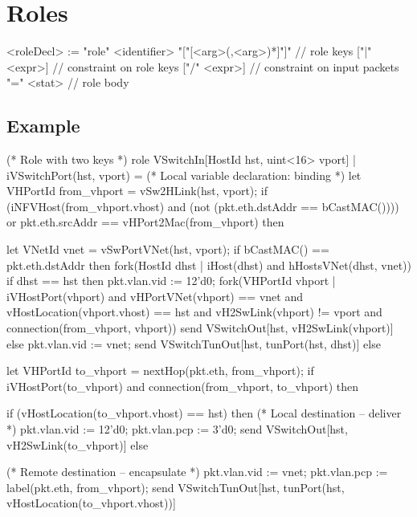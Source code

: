 \documentclass{report}
\begin{document}
\section{Roles}

\begin{bnflisting}{}
<roleDecl> := "role" <identifier> 
              "["[<arg>(,<arg>)*]"]" // role keys
              ["|" <expr>]    // constraint on role keys
              ["/" <expr>]    // constraint on input packets
              "=" <stat>      // role body
\end{bnflisting}

\subsection*{Example}

\begin{ccnlisting}{}
(* Role with two keys *)
role VSwitchIn[HostId hst, uint<16> vport] | iVSwitchPort(hst, vport) = 
    (* Local variable declaration: binding *)
    let VHPortId from_vhport = vSw2HLink(hst, vport);
    if (iNFVHost(from_vhport.vhost) and (not (pkt.eth.dstAddr == bCastMAC()))) or 
       pkt.eth.srcAddr == vHPort2Mac(from_vhport) then {
        let VNetId vnet = vSwPortVNet(hst, vport);
        if bCastMAC() == pkt.eth.dstAddr then {
            fork(HostId dhst | iHost(dhst) and hHostsVNet(dhst, vnet)) {
                if dhst == hst then {
                    pkt.vlan.vid := 12'd0;
                    fork(VHPortId vhport | iVHostPort(vhport) and 
                                           vHPortVNet(vhport) == vnet and 
                                           vHostLocation(vhport.vhost) == hst and 
                                           vH2SwLink(vhport) != vport and
                                           connection(from_vhport, vhport)) {
                        send VSwitchOut[hst, vH2SwLink(vhport)]
                    }
                } else {
                    pkt.vlan.vid := vnet;
                    send VSwitchTunOut[hst, tunPort(hst, dhst)]
                }
            }
        } else {
            let VHPortId to_vhport = nextHop(pkt.eth, from_vhport);
            if iVHostPort(to_vhport) and connection(from_vhport, to_vhport) then {
                if (vHostLocation(to_vhport.vhost) == hst) then { 
                    (* Local destination -- deliver *)
                    pkt.vlan.vid := 12'd0;
                    pkt.vlan.pcp := 3'd0;
                    send VSwitchOut[hst, vH2SwLink(to_vhport)]
                } else {
                    (* Remote destination -- encapsulate *)
                    pkt.vlan.vid := vnet;
                    pkt.vlan.pcp := label(pkt.eth, from_vhport);
                    send VSwitchTunOut[hst, 
                                       tunPort(hst, 
                                               vHostLocation(to_vhport.vhost))]

                }
            }
        }
    }
\end{ccnlisting}
\end{document}
